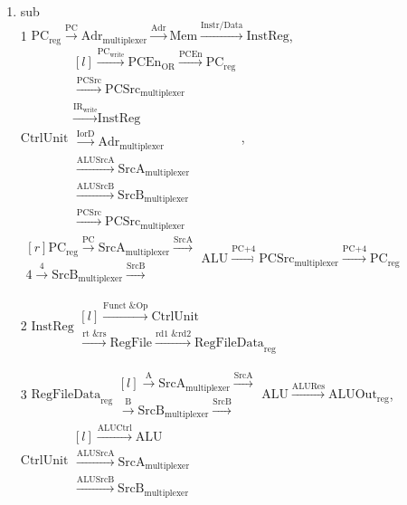\documentclass{article}
\begin{document}
\begin{enumerate}
    \item sub\\
1 $\text{PC}_\text{reg} \xrightarrow{\text{PC}} \text{Adr}_\text{multiplexer} \xrightarrow{\text{Adr}} \text{Mem} \xrightarrow{\text{Instr/Data}} \text{InstReg}$, $\text{CtrlUnit} \begin{matrix*}[l] 
\xrightarrow{\text{PC}_\text{write}} \text{PCEn}_\text{OR} \xrightarrow{\text{PCEn}} \text{PC}_\text{reg} \\ 
\xrightarrow{\text{PCSrc}} \text{PCSrc}_\text{multiplexer} \\
\xrightarrow{\text{IR}_\text{write}} \text{InstReg} \\
\xrightarrow{\text{IorD}} \text{Adr}_\text{multiplexer} \\ \xrightarrow{\text{ALUSrcA}} \text{SrcA}_\text{multiplexer} \\ \xrightarrow{\text{ALUSrcB}} \text{SrcB}_\text{multiplexer} \\ \xrightarrow{\text{PCSrc}} \text{PCSrc}_\text{multiplexer} \end{matrix*}$,\\ $\begin{matrix*}[r] \text{PC}_\text{reg} \xrightarrow{\text{PC}} \text{SrcA}_\text{multiplexer} \xrightarrow{\text{SrcA}} \\ \text{4} \xrightarrow{\text{4}} \text{SrcB}_\text{multiplexer} \xrightarrow{\text{SrcB}}\end{matrix*} \text{ALU} \xrightarrow{\text{PC+4}} \text{PCSrc}_\text{multiplexer} \xrightarrow{\text{PC+4}} \text{PC}_\text{reg}$\\

\bigbreak

2 $\text{InstReg} \begin{matrix*}[l] 
\xrightarrow{\text{Funct \& Op}} \text{CtrlUnit} \\ \xrightarrow{\text{rt \& rs}} \text{RegFile} \xrightarrow{\text{rd1 \& rd2}} \text{RegFileData}_\text{reg} \end{matrix*}$\\

\bigbreak

3 $\text{RegFileData}_\text{reg} \begin{matrix*}[l] \xrightarrow{\text{A}} \text{SrcA}_\text{multiplexer} \xrightarrow{\text{SrcA}} \\ \xrightarrow{\text{B}} \text{SrcB}_\text{multiplexer} \xrightarrow{\text{SrcB}} \end{matrix*} \text{ALU} \xrightarrow{\text{ALURes}} \text{ALUOut}_\text{reg}$, $\text{CtrlUnit} \begin{matrix*}[l] 
\xrightarrow{\text{ALUCtrl}} \text{ALU} \\ \xrightarrow{\text{ALUSrcA}} \text{SrcA}_\text{multiplexer} \\ \xrightarrow{\text{ALUSrcB}} \text{SrcB}_\text{multiplexer} \end{matrix*}$\\


\end{enumerate}
\end{document}
